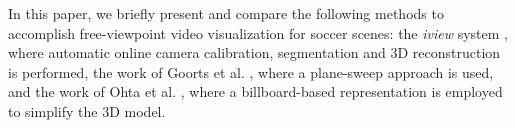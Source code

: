 
In this paper, we briefly present and compare the following methods to accomplish free-viewpoint video 
visualization for soccer scenes: the \textit{iview} system \cite{02_iview}, where automatic online camera calibration, 
segmentation and 3D reconstruction is performed,
the work of Goorts et al. \cite{05_plane_sweeping}, where a plane-sweep approach is used,
and the work of Ohta et al. \cite{03_billboard}, where a billboard-based representation is employed to simplify the 
3D model.


